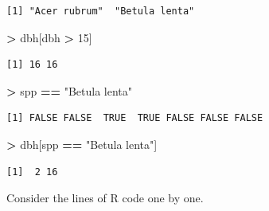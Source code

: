 \documentclass[]{krantz}
\makeatletter
\newenvironment{Shaded}{\begin{snugshade}}{\end{snugshade}}
\newcommand{\DecValTok}[1]{\textcolor[rgb]{0.06,0.06,0.06}{#1}}
\newcommand{\NormalTok}[1]{#1}
\newcommand{\OperatorTok}[1]{\textcolor[rgb]{0.43,0.43,0.43}{\textbf{#1}}}
\newcommand{\StringTok}[1]{\textcolor[rgb]{0.5,0.5,0.5}{#1}}
\newenvironment{kframe}{%
\medskip{}
\setlength{\fboxsep}{.8em}
 \def\at@end@of@kframe{}%
 \ifinner\ifhmode%
  \def\at@end@of@kframe{\end{minipage}}%
  \begin{minipage}{\columnwidth}%
 \fi\fi%
 \def\FrameCommand##1{\hskip\@totalleftmargin \hskip-\fboxsep
 \colorbox{shadecolor}{##1}\hskip-\fboxsep
     \hskip-\linewidth \hskip-\@totalleftmargin \hskip\columnwidth}%
 \MakeFramed {\advance\hsize-\width
   \@totalleftmargin\z@ \linewidth\hsize
   \@setminipage}}%
 {\par\unskip\endMakeFramed%
 \at@end@of@kframe}
\renewenvironment{Shaded}{\begin{kframe}}{\end{kframe}}
\makeatother
\begin{document}
\begin{verbatim}
[1] "Acer rubrum"  "Betula lenta"
\end{verbatim}

\begin{Shaded}
\begin{Highlighting}[]
\OperatorTok{>}\StringTok{ }\NormalTok{dbh[dbh }\OperatorTok{>}\StringTok{ }\DecValTok{15}\NormalTok{]}
\end{Highlighting}
\end{Shaded}

\begin{verbatim}
[1] 16 16
\end{verbatim}

\begin{Shaded}
\begin{Highlighting}[]
\OperatorTok{>}\StringTok{ }\NormalTok{spp }\OperatorTok{==}\StringTok{ "Betula lenta"}
\end{Highlighting}
\end{Shaded}

\begin{verbatim}
[1] FALSE FALSE  TRUE  TRUE FALSE FALSE FALSE
\end{verbatim}

\begin{Shaded}
\begin{Highlighting}[]
\OperatorTok{>}\StringTok{ }\NormalTok{dbh[spp }\OperatorTok{==}\StringTok{ "Betula lenta"}\NormalTok{]}
\end{Highlighting}
\end{Shaded}

\begin{verbatim}
[1]  2 16
\end{verbatim}

Consider the lines of R code one by one.
\end{document}

